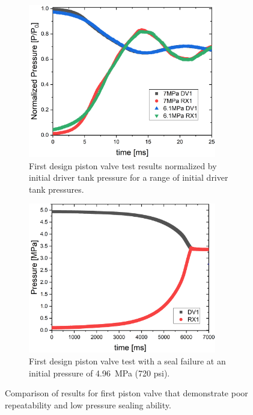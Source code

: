\begin{figure}[b!]
    \vspace{16pt}
    \centering
    \begin{subfigure}[t]{0.45\textwidth}
        \centering
        \includegraphics[width=0.9\textwidth]{results/plots/Normalized_RX1_MTM.png}
        \caption{First design piston valve test results normalized by initial driver tank pressure for a range of initial driver tank pressures.}
        \label{fig:norm}
    \end{subfigure}
    \hfill
    \begin{subfigure}[t]{0.45\textwidth}
        \centering
        \includegraphics[width=0.9\textwidth]{results/plots/718psi_MtM_annular.png}
        \caption{First design piston valve test with a seal failure at an initial pressure of \SI{4.96}{\mega\pascal} (720 psi).}
        \label{fig:piston 2 test}
    \end{subfigure}
    \caption{Comparison of results for first piston valve that demonstrate poor repeatability and low pressure sealing ability.}
    \label{fig:piston repeatability}
    \vspace{16pt}
\end{figure}


